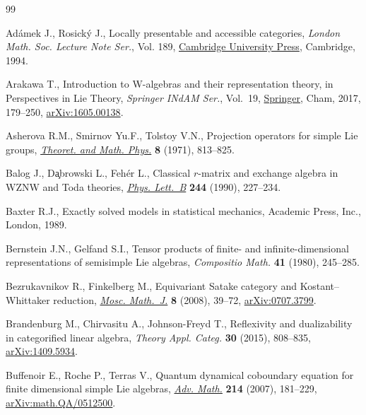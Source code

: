 \documentclass[pdftex]{sigma}
\numberwithin{equation}{section}
\begin{document}
\begin{thebibliography}{99}
\footnotesize\itemsep=0pt

Ad\'amek J., Rosick\'y J., Locally presentable and accessible categories,
 \textit{London Math. Soc. Lecture Note Ser.}, Vol. 189, \href{https://doi.org/10.1017/CBO9780511600579}{Cambridge University
 Press}, Cambridge, 1994.

Arakawa T., Introduction to {W}-algebras and their representation theory, in
 Perspectives in {L}ie {T}heory, \textit{Springer INdAM Ser.}, Vol.~19,
 \href{https://doi.org/10.1007/978-3-319-58971-8_4}{Springer}, Cham, 2017, 179--250, \href{https://arxiv.org/abs/1605.00138}{arXiv:1605.00138}.

Asherova R.M., Smirnov Yu.F., Tolstoy V.N., Projection operators for simple
 {L}ie groups, \href{https://doi.org/10.1007/BF01038003}{\textit{Theoret. and Math. Phys.}} \textbf{8} (1971), 813--825.

Balog J., D\c{a}browski L., Feh\'er L., Classical {$r$}-matrix and exchange
 algebra in {WZNW} and {T}oda theories, \href{https://doi.org/10.1016/0370-2693(90)90060-J}{\textit{Phys. Lett.~B}} \textbf{244}
 (1990), 227--234.

Baxter R.J., Exactly solved models in statistical mechanics, Academic Press,
 Inc., London, 1989.

Bernstein J.N., Gelfand S.I., Tensor products of finite- and
 infinite-dimensional representations of semisimple {L}ie algebras,
 \textit{Compositio Math.} \textbf{41} (1980), 245--285.

Bezrukavnikov R., Finkelberg M., Equivariant {S}atake category and
 {K}ostant--{W}hittaker reduction, \href{https://doi.org/10.17323/1609-4514-2008-8-1-39-72}{\textit{Mosc. Math.~J.}} \textbf{8} (2008),
 39--72, \href{https://arxiv.org/abs/0707.3799}{arXiv:0707.3799}.

Brandenburg M., Chirvasitu A., Johnson-Freyd T., Reflexivity and dualizability
 in categorified linear algebra, \textit{Theory Appl. Categ.} \textbf{30}
 (2015), 808--835, \href{https://arxiv.org/abs/1409.5934}{arXiv:1409.5934}.

Buffenoir E., Roche P., Terras V., Quantum dynamical coboundary equation for
 finite dimensional simple {L}ie algebras, \href{https://doi.org/10.1016/j.aim.2007.02.001}{\textit{Adv. Math.}} \textbf{214}
 (2007), 181--229, \href{https://arxiv.org/abs/math.QA/0512500}{arXiv:math.QA/0512500}.


\end{thebibliography}
\end{document}
